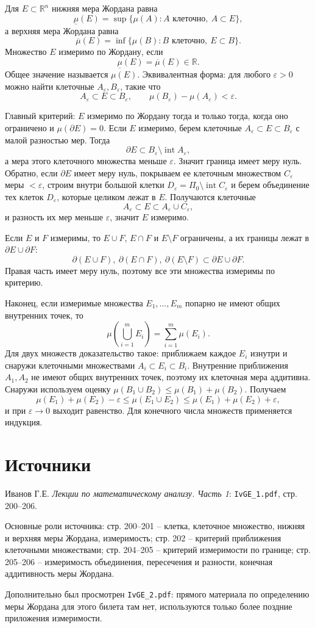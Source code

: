 \documentclass[12pt,a4paper]{article}
\newcommand{\R}{\mathbb{R}}
\newcommand{\eps}{\varepsilon}
\newcommand{\Int}{\operatorname{int}}
\newcommand{\Fr}{\partial}
\newcommand{\lowmu}{\underline{\mu}}
\newcommand{\upmu}{\overline{\mu}}
\begin{document}
Для \(E\subset\R^n\) нижняя мера Жордана равна
\[
  \lowmu(E)=\sup\{\mu(A): A\text{ клеточно},\ A\subset E\},
\]
а верхняя мера Жордана равна
\[
  \upmu(E)=\inf\{\mu(B): B\text{ клеточно},\ E\subset B\}.
\]
Множество \(E\) измеримо по Жордану, если
\[
  \lowmu(E)=\upmu(E)\in\R.
\]
Общее значение называется \(\mu(E)\). Эквивалентная форма: для любого
\(\eps>0\) можно найти клеточные \(A_\eps,B_\eps\), такие что
\[
  A_\eps\subset E\subset B_\eps,\qquad
  \mu(B_\eps)-\mu(A_\eps)<\eps.
\]

Главный критерий: \(E\) измеримо по Жордану тогда и только тогда, когда оно
ограничено и \(\mu(\Fr E)=0\). Если \(E\) измеримо, берем клеточные
\(A_\eps\subset E\subset B_\eps\) с малой разностью мер. Тогда
\[
  \Fr E\subset B_\eps\setminus\Int A_\eps,
\]
а мера этого клеточного множества меньше \(\eps\). Значит граница имеет меру
нуль. Обратно, если \(\Fr E\) имеет меру нуль, покрываем ее клеточным
множеством \(C_\eps\) меры \(<\eps\), строим внутри большой клетки
\(D_\eps=\Pi_0\setminus\Int C_\eps\) и берем объединение тех клеток
\(D_\eps\), которые целиком лежат в \(E\). Получаются клеточные
\[
  A_\eps\subset E\subset A_\eps\cup C_\eps,
\]
и разность их мер меньше \(\eps\), значит \(E\) измеримо.

Если \(E\) и \(F\) измеримы, то \(E\cup F\), \(E\cap F\) и \(E\setminus F\)
ограничены, а их границы лежат в \(\Fr E\cup\Fr F\):
\[
  \Fr(E\cup F),\ \Fr(E\cap F),\ \Fr(E\setminus F)
  \subset \Fr E\cup\Fr F.
\]
Правая часть имеет меру нуль, поэтому все эти множества измеримы по критерию.

Наконец, если измеримые множества \(E_1,\dots,E_m\) попарно не имеют общих
внутренних точек, то
\[
  \mu\left(\bigcup_{i=1}^mE_i\right)=\sum_{i=1}^m\mu(E_i).
\]
Для двух множеств доказательство такое: приближаем каждое \(E_i\) изнутри и
снаружи клеточными множествами \(A_i\subset E_i\subset B_i\). Внутренние
приближения \(A_1,A_2\) не имеют общих внутренних точек, поэтому их клеточная
мера аддитивна. Снаружи используем оценку
\(\mu(B_1\cup B_2)\le\mu(B_1)+\mu(B_2)\). Получаем
\[
  \mu(E_1)+\mu(E_2)-\eps
  \le
  \mu(E_1\cup E_2)
  \le
  \mu(E_1)+\mu(E_2)+\eps,
\]
и при \(\eps\to0\) выходит равенство. Для конечного числа множеств применяется
индукция.

\section*{Источники}

Иванов Г.Е. \emph{Лекции по математическому анализу. Часть 1}:
\texttt{IvGE\_1.pdf}, стр. 200--206.

Основные роли источника: стр. 200--201 -- клетка, клеточное множество, нижняя
и верхняя меры Жордана, измеримость; стр. 202 -- критерий приближения
клеточными множествами; стр. 204--205 -- критерий измеримости по границе;
стр. 205--206 -- измеримость объединения, пересечения и разности, конечная
аддитивность меры Жордана.

Дополнительно был просмотрен \texttt{IvGE\_2.pdf}: прямого материала по
определению меры Жордана для этого билета там нет, используются только более
поздние приложения измеримости.
\end{document}
